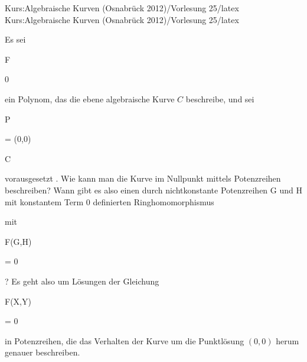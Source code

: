 Kurs:Algebraische Kurven (Osnabrück 2012)/Vorlesung 25/latex
Kurs:Algebraische Kurven (Osnabrück 2012)/Vorlesung 25/latex

\setcounter{section}{25}




Es sei


\mavergleichskette

{\vergleichskette

{ F
}

{ \neq }{ 0
}

{  }{
}

{    }{
}

{   }{
}

}
{}{}{}
ein Polynom, das die ebene algebraische Kurve $C$ beschreibe, und sei


\mavergleichskette

{\vergleichskette

{ P
}

{ = }{ (0,0)
}

{ \in }{ C
}

{    }{
}

{   }{
}

}
{}{}{}
vorausgesetzt
 {} {.}
Wie kann man die Kurve im Nullpunkt mittels Potenzreihen beschreiben? Wann gibt es also einen durch nichtkonstante Potenzreihen
\mathkor {} {G} {und} {H} {}
mit konstantem Term $0$ definierten Ringhomomorphismus


 {  }


mit


\mavergleichskette

{\vergleichskette

{ F(G,H)
}

{ = }{ 0
}

{  }{
}

{    }{
}

{   }{
}

}
{}{}{}
 {} {?}
Es geht also um Lösungen der Gleichung


\mavergleichskettedisp

{\vergleichskette

{ F(X,Y)
}

{ =} { 0
}

{ } {
}

{ } {
}

{ } {
}

}
{}{}{}
in Potenzreihen, die das Verhalten der Kurve um die Punktlösung $(0,0)$ herum genauer beschreiben.


